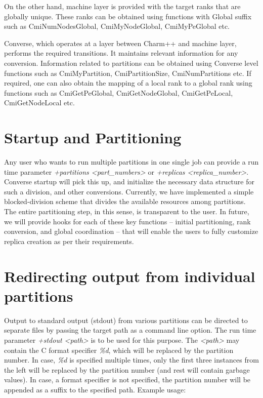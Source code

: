 On the other hand, machine layer is provided with the target ranks that
are globally unique. These ranks can be obtained using functions with Global
suffix such as CmiNumNodesGlobal, CmiMyNodeGlobal, CmiMyPeGlobal etc.

Converse, which operates at a layer between Charm++ and machine layer,
performs the required transitions. It maintains relevant information for any
conversion. Information related to partitions can be obtained using Converse
level functions such as CmiMyPartition, CmiPartitionSize, CmiNumPartitions
etc. If required, one can also obtain the mapping of a local rank to a global
rank using functions such as CmiGetPeGlobal, CmiGetNodeGlobal,  CmiGetPeLocal,
CmiGetNodeLocal etc.       


\section{Startup and Partitioning}

Any user who wants to run multiple partitions in one single job can provide a
run time parameter \emph{+partitions <part\_numbers>} or \emph{+replicas
<replica\_number>}.
Converse startup will pick this up, and initialize the necessary data
structure for such a division, and other conversions.  Currently, we have
implemented a simple blocked-division scheme that divides the available
resources among partitions. The entire partitioning step, in this sense, is
transparent to the user. In future, we will provide hooks for each of these
key functions – initial partitioning, rank conversion, and global coordination
– that will enable the users to fully customize replica creation as per their
requirements.

\section{Redirecting output from individual partitions}
Output to standard output (stdout) from various partitions can be directed 
to separate files by passing the target path as a command line option. The run
time parameter \emph{+stdout <path>} is to be used for this purpose. The
\emph{<path>} may
contain the C format specifier \emph{\%d}, which will be replaced by the
partition number. In case, \emph{\%d} is specified multiple times, only the first
three instances from the left will be replaced by the partition number (and rest
will contain garbage values). In case, a format specifier is not specified, 
the partition number will be appended as a suffix to the specified path. Example usage:

